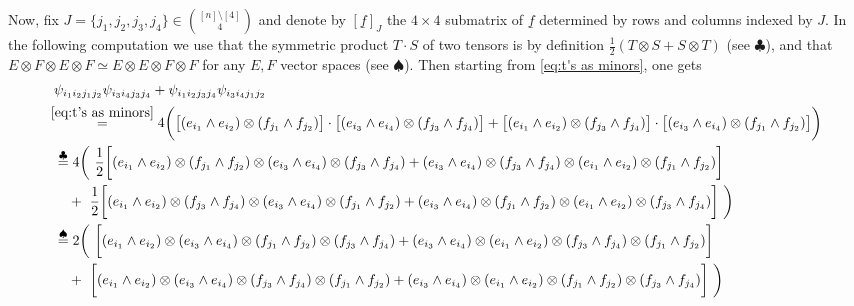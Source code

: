 \documentclass[11pt,reqno]{amsart}
\theoremstyle{definition}
\numberwithin{theorem}{section}
\numberwithin{equation}{section}
\begin{document}
Now, fix $J=\{j_1,j_2,j_3,j_4\}\in \binom{[n]\setminus [4]}{4}$ and denote by $[\underline{f}]_{J}$ the $4\times 4$ submatrix of $\underline{f}$ determined by rows and columns indexed by $J$. In the following computation we use that the symmetric product $T\cdot S$ of two tensors is by definition $\frac{1}{2}(T\otimes S + S\otimes T)$ (see $\clubsuit$), and that $E \otimes F \otimes E \otimes F\simeq E \otimes E \otimes F \otimes F$ for any $E,F$ vector spaces (see $\spadesuit$). Then starting from \eqref{eq:t's as minors}, one gets
\newpage
{\scriptsize
\begin{align}\label{eq:binomials in t's}
    & \psi_{i_1i_2j_1j_2}\psi_{i_3i_4j_3j_4} + \psi_{i_1i_2j_3j_4}\psi_{i_3i_4j_1j_2} \nonumber \\
    & \! \! \! \stackrel{\eqref{eq:t's as minors}}{=} 4\bigg( \big[ (e_{i_1}\wedge e_{i_2})\otimes (f_{j_1}\wedge f_{j_2}) \big] \cdot \big[ (e_{i_3}\wedge e_{i_4})\otimes (f_{j_3}\wedge f_{j_4}) \big] + \big[ (e_{i_1}\wedge e_{i_2})\otimes (f_{j_3}\wedge f_{j_4}) \big] \cdot \big[ (e_{i_3}\wedge e_{i_4})\otimes (f_{j_1}\wedge f_{j_2}) \big] \bigg) \nonumber \\ 
    & \stackrel{\clubsuit}{=} 4\bigg( \ 
        \frac{1}{2} \bigg[ (e_{i_1}\wedge e_{i_2})\otimes (f_{j_1}\wedge f_{j_2}) \otimes (e_{i_3}\wedge e_{i_4})\otimes (f_{j_3}\wedge f_{j_4}) 
        +  (e_{i_3}\wedge e_{i_4})\otimes (f_{j_3}\wedge f_{j_4}) \otimes (e_{i_1}\wedge e_{i_2})\otimes (f_{j_1}\wedge f_{j_2}) \bigg] \  \nonumber\\
        & \quad + \ \frac{1}{2}\bigg[ (e_{i_1}\wedge e_{i_2})\otimes (f_{j_3}\wedge f_{j_4}) \otimes (e_{i_3}\wedge e_{i_4})\otimes (f_{j_1}\wedge f_{j_2}) 
        +  (e_{i_3}\wedge e_{i_4})\otimes (f_{j_1}\wedge f_{j_2}) \otimes (e_{i_1}\wedge e_{i_2})\otimes (f_{j_3}\wedge f_{j_4}) \bigg] \ \bigg) \nonumber\\
    & \stackrel{\spadesuit}{=}  2 \bigg( \ 
        \bigg[ (e_{i_1}\wedge e_{i_2}) \otimes (e_{i_3}\wedge e_{i_4})\otimes (f_{j_1}\wedge f_{j_2})\otimes (f_{j_3}\wedge f_{j_4}) 
        +  (e_{i_3}\wedge e_{i_4}) \otimes (e_{i_1}\wedge e_{i_2})\otimes (f_{j_3}\wedge f_{j_4})\otimes (f_{j_1}\wedge f_{j_2}) \bigg] \  \nonumber\\
        & \quad + \ \bigg[ (e_{i_1}\wedge e_{i_2}) \otimes (e_{i_3}\wedge e_{i_4})\otimes (f_{j_3}\wedge f_{j_4})\otimes (f_{j_1}\wedge f_{j_2}) 
        +  (e_{i_3}\wedge e_{i_4}) \otimes (e_{i_1}\wedge e_{i_2})\otimes (f_{j_1}\wedge f_{j_2})\otimes (f_{j_3}\wedge f_{j_4}) \bigg] \ \bigg) \nonumber\\

\end{align}}
\end{document}
